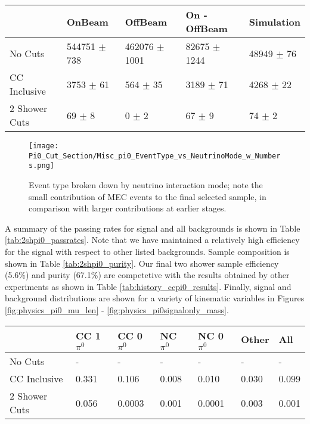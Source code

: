 \begin{table}[H] 
 \centering
 \begin{tabular}{| l | l | l | l | l |}
  \hline
   & OnBeam & OffBeam & On - OffBeam & Simulation \\ [0.1ex] \hline
No Cuts & 544751 $\pm$ 738 & 462076 $\pm$ 1001 & 82675 $\pm$ 1244 & 48949 $\pm$ 76 \\ 
CC Inclusive & 3753 $\pm$ 61 & 564 $\pm$ 35 & 3189 $\pm$ 71 & 4268 $\pm$ 22 \\ 
2 Shower Cuts & 69 $\pm$ 8 & 0 $\pm$ 2 & 67 $\pm$ 9 & 74 $\pm$ 2  \\ \hline
\end{tabular}
 \end{table}



\begin{figure}[H]
\centering
\texttt{[image: Pi0\_Cut\_Section/Misc\_pi0\_EventType\_vs\_NeutrinoMode\_w\_Numbers.png]}
\caption{ Event type broken down by neutrino interaction mode; note the small contribution of MEC events to the final selected sample, in comparison with larger contributions at earlier stages. }
\label{fig:physics_2shower_inttype}
\end{figure}

\par A summary of the passing rates for signal and all backgrounds is shown in Table \ref{tab:2shpi0_passrates}.  Note that we have maintained a relatively high efficiency for the signal with respect to other listed backgrounds. Sample composition is shown in Table \ref{tab:2shpi0_purity}. Our final two shower sample efficiency (5.6\%) and purity (67.1\%) are competetive with the results obtained by other experiments as shown in Table \ref{tab:history_ccpi0_results}.   Finally, signal and background distributions are shown for a variety of kinematic variables in Figures \ref{fig:physics_pi0_mu_len} - \ref{fig:physics_pi0signalonly_mass}. 

\begin{table}[H]
\centering
{}
 \begin{tabular}{| l | l | l |l|l|l|l|}
 \hline
 & CC 1$\pi^0$ & CC 0$\pi^0$ & NC $\pi^0$ & NC 0$\pi^0$ & Other & All \\ [0.1ex] \hline
No Cuts & - & - & - & - & - & -\\
CC Inclusive & 0.331 & 0.106 & 0.008 & 0.010 & 0.030 & 0.099 \\ 
2 Shower Cuts & 0.056 & 0.0003 & 0.001 & 0.0001 & 0.003 & 0.001 \\ \hline
\end{tabular}
\end{table}

